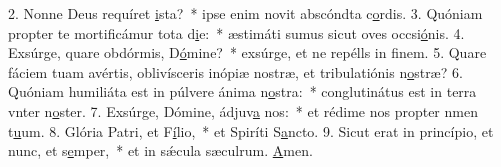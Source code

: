 2. Nonne Deus requíret \uline{i}sta?~* ipse enim novit abscóndta c\uline{o}rdis.
3. Quóniam propter te mortificámur tota d\uline{i}e:~* æstimáti sumus sicut oves occsi\uline{ó}nis.
4. Exsúrge, quare obdórmis, D\uline{ó}mine?~* exsúrge, et ne repélls in f\uline{i}nem.
5. Quare fáciem tuam avértis, oblivísceris inópiæ nostræ, et tribulatiónis n\uline{o}stræ?
6. Quóniam humiliáta est in púlvere ánima n\uline{o}stra:~* conglutinátus est in terra vnter n\uline{o}ster.
7. Exsúrge, Dómine, ádjuv\uline{a} nos:~* et rédime nos propter nmen t\uline{u}um.
8. Glória Patri, et F\uline{í}lio,~* et Spiríti S\uline{a}ncto.
9. Sicut erat in princípio, et nunc, et s\uline{e}mper,~* et in sǽcula sæculrum. \uline{A}men.
